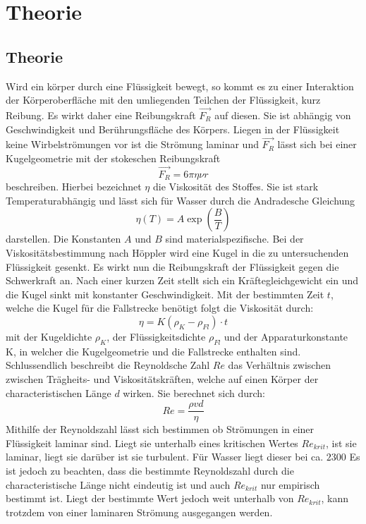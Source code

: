 
\section{Theorie}
\label{sec:Theorie}
\subsection{Theorie}
Wird ein körper durch eine Flüssigkeit bewegt, so kommt es zu einer Interaktion
der Körperoberfläche mit den umliegenden Teilchen der Flüssigkeit, kurz Reibung.
 Es wirkt daher eine Reibungskraft $\vec{F_R}$ auf diesen. Sie ist abhängig von
Geschwindigkeit und Berührungsfläche des Körpers. Liegen in der Flüssigkeit
keine Wirbelströmungen vor ist die Strömung laminar und $\vec{F_R}$ lässt sich
bei einer Kugelgeometrie mit der stokeschen Reibungskraft
\begin{equation}
  \vec{F_R} = 6 \pi \eta \nu r\label{stokeR}
  \end{equation}
  beschreiben. Hierbei bezeichnet $\eta$ die Viskosität des Stoffes. Sie ist
  stark Temperaturabhängig und lässt sich für Wasser durch die Andradesche
  Gleichung
  \begin{equation}
    \eta(T) = A \exp(\frac{B}{T})\label{andra}
    \end{equation}
darstellen. Die Konstanten $A$ und $B$ sind materialspezifische.
Bei der Viskositätsbestimmung nach Höppler wird eine Kugel in die zu untersuchenden
Flüssigkeit gesenkt. Es wirkt nun die Reibungskraft der Flüssigkeit gegen die
Schwerkraft an. Nach einer kurzen Zeit stellt sich ein Kräftegleichgewicht ein und
 die Kugel sinkt mit konstanter Geschwindigkeit. Mit der bestimmten Zeit $t$, welche
  die Kugel für die Fallstrecke benötigt folgt die Viskosität durch:
  \begin{equation}
    \eta = K(\rho_K - \rho_{Fl})\cdot t\label{visko}
    \end{equation}
mit der Kugeldichte $\rho_K$, der Flüssigkeitsdichte $\rho_{Fl}$ und der
Apparaturkonstante K, in welcher die Kugelgeometrie und die Fallstrecke enthalten sind.
Schlussendlich beschreibt die Reynoldsche Zahl $Re$ das Verhältnis zwischen
zwischen Trägheits- und Viskositätskräften, welche auf einen Körper der
characteristischen Länge $d$ wirken. Sie berechnet sich durch:
\begin{equation}
  Re = \frac{\rho v d}{\eta}\label{Re}
  \end{equation}
  Mithilfe der Reynoldszahl lässt sich bestimmen ob Strömungen in einer
  Flüssigkeit laminar sind. Liegt sie unterhalb eines kritischen Wertes $Re_{krit}$, ist
  sie laminar, liegt sie darüber ist sie turbulent. Für Wasser liegt dieser bei ca. $2300$ \cite{Rekrit}
Es ist jedoch zu beachten, dass die bestimmte Reynoldszahl durch die characteristische Länge nicht eindeutig ist und auch
$Re_{krit}$ nur empirisch bestimmt ist. Liegt der bestimmte Wert jedoch weit unterhalb
 von $Re_{krit}$, kann trotzdem von einer laminaren Strömung ausgegangen werden.
